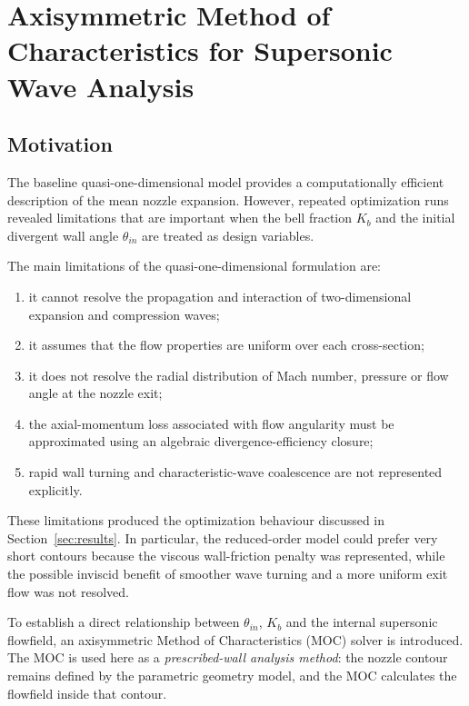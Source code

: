 \section{Axisymmetric Method of Characteristics for
Supersonic Wave Analysis}
\label{sec:moc}

\subsection{Motivation}

The baseline quasi-one-dimensional model provides a computationally
efficient description of the mean nozzle expansion. However, repeated
optimization runs revealed limitations that are important when the
bell fraction $K_b$ and the initial divergent wall angle
$\theta_{in}$ are treated as design variables.

The main limitations of the quasi-one-dimensional formulation are:

\begin{enumerate}
    \item it cannot resolve the propagation and interaction of
    two-dimensional expansion and compression waves;

    \item it assumes that the flow properties are uniform over each
    cross-section;

    \item it does not resolve the radial distribution of Mach number,
    pressure or flow angle at the nozzle exit;

    \item the axial-momentum loss associated with flow angularity must
    be approximated using an algebraic divergence-efficiency closure;

    \item rapid wall turning and characteristic-wave coalescence are
    not represented explicitly.
\end{enumerate}

These limitations produced the optimization behaviour discussed in
Section~\ref{sec:results}. In particular, the reduced-order model could
prefer very short contours because the viscous wall-friction penalty
was represented, while the possible inviscid benefit of smoother wave
turning and a more uniform exit flow was not resolved.

To establish a direct relationship between $\theta_{in}$, $K_b$ and
the internal supersonic flowfield, an axisymmetric Method of
Characteristics (MOC) solver is introduced. The MOC is used here as a
\emph{prescribed-wall analysis method}: the nozzle contour remains
defined by the parametric geometry model, and the MOC calculates the
flowfield inside that contour.


